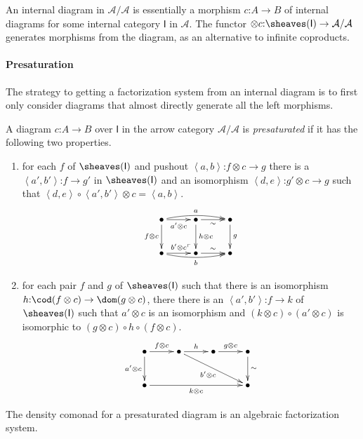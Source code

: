 \documentclass{tac}
\makeatletter
\newcommand\hide[1]{}
\newcommand\keyword[1]{\emph{#1}\label{#1}}
\newcommand\cat\mathcal
\newcommand\icat\mathsf
\newcommand\of{\mathord:}
\newcommand\tuplet[1]{\left\langle #1 \right\rangle}
\newcommand\pushed{\ar@{}[ul]|(.2)\ulcorner}
\makeatother
\begin{document}
An internal diagram in $\cat A/\cat A$ is essentially a morphism $c\of A\to B$ of internal diagrams for some internal category $\icat I$ in $\cat A$. The functor $\otimes c\of \sheaves(\icat I)\to \cat A/\cat A$ generates morphisms from the diagram, as an alternative to infinite coproducts.

\paragraph{Presaturation}
The strategy to getting a factorization system from an internal diagram is to first only consider diagrams that almost directly generate all the left morphisms.

\begin{definition}
A diagram $c\of A\to B$ over $\icat I$ in the arrow category $\cat A/\cat A$ is \keyword{presaturated} if it has the following two properties.
\begin{enumerate}
\item for each $f$ of $\sheaves(\icat I)$ and pushout $\tuplet{a,b}\of f\otimes c\to g$ there is a $\tuplet{a',b'}\of f\to g'$ in $\sheaves(\icat I)$ and an isomorphism $\tuplet{d,e}\of g'\otimes c\to g$ such that $\tuplet{d,e}\circ \tuplet{a',b'}\otimes c = \tuplet{a,b}$.
\[\xymatrix{
\bullet \ar[r]_{a'\otimes c}\ar[d]_{f\otimes c}\ar@/^1ex/[rr]^a &
\bullet \ar[r]_\sim \ar[d]^{h\otimes c} & \bullet\ar[d]^g \\
\bullet \ar[r]^{b'\otimes c} \ar@/_1ex/[rr]_b &
\bullet\pushed \ar[r]^\sim & \bullet
}\]
\item for each pair $f$ and $g$ of $\sheaves(\icat I)$ such that there is an isomorphism $h\of\cod(f\otimes c)\to \dom(g\otimes c)$, there there is an $\tuplet{a',b'}\of f\to k$ of $\sheaves(\icat I)$ such that $a'\otimes c$ is an isomorphism and $(k\otimes c)\circ (a'\otimes c)$ is isomorphic to $(g\otimes c)\circ h \circ (f\otimes c)$.
\[\xymatrix{
\bullet\ar[d]_{a'\otimes c}\ar[r]^{f\otimes c} & \bullet\ar[r]^h\ar[drr]_{b'\otimes c} & \bullet\ar[r]^{g\otimes c} & \bullet\ar[d]^\sim\\
\bullet\ar[rrr]_{k\otimes c} &&& \bullet 
}\]
\end{enumerate}
\end{definition}

\begin{lemma} The density comonad for a presaturated diagram is an algebraic factorization system. \hide{define this somewhere, or refer to literature}
\end{lemma}
\end{document}
